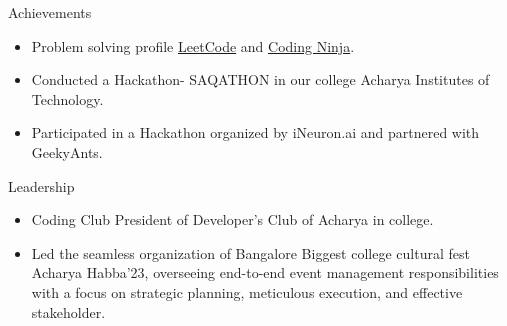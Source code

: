 \documentclass{resume} %
\begin{document}
\begin{rSection}{Achievements} 
\begin{itemize}
    \item  Problem solving profile \href{https://www.faangpath.com/blog/}{LeetCode} and  \href{https://www.faangpath.com/blog/}{Coding Ninja}.
\item   Conducted a Hackathon- SAQATHON in our college Acharya Institutes of Technology.
\item  Participated in a Hackathon organized by iNeuron.ai and partnered with GeekyAnts.
\end{itemize}


\end{rSection}

\begin{rSection}{Leadership} 
\begin{itemize}
    \item Coding Club President of Developer’s Club of Acharya in college.
    \item Led the seamless organization of Bangalore Biggest college cultural fest Acharya Habba’23, overseeing end-to-end event
management responsibilities with a focus on strategic planning, meticulous execution, and effective stakeholder.
\end{itemize}


\end{rSection}
\end{document}

